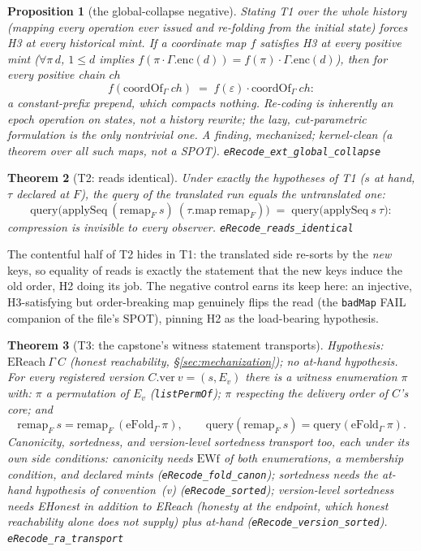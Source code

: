 \documentclass[11pt]{article}
\newtheorem{theorem}{Theorem}[section]
\newtheorem{proposition}[theorem]{Proposition}
\newcommand{\lean}[1]{\texttt{#1}}
\newcommand{\code}[1]{\texttt{#1}}
\begin{document}
\begin{proposition}[the global-collapse negative]
\label{prop:globalcollapse}
Stating T1 over the whole history (mapping every operation ever
issued and re-folding from the initial state) forces H3 at
every historical mint. If a coordinate map $f$ satisfies H3 at
\emph{every} positive mint ($\forall \pi\, d$, $1 \le d$ implies
$f(\pi \cdot \Gamma.\mathrm{enc}(d)) = f(\pi) \cdot
\Gamma.\mathrm{enc}(d)$), then for every positive chain $\mathit{ch}$
\[
  f(\mathrm{coordOf}_\Gamma\ \mathit{ch}) \;=\; f(\varepsilon) \cdot
  \mathrm{coordOf}_\Gamma\ \mathit{ch} :
\]
a constant-prefix prepend, which compacts \emph{nothing}. Re-coding is
inherently an epoch operation on states, not a history rewrite; the
lazy, cut-parametric formulation is the only nontrivial one. A
finding, mechanized; kernel-clean (a theorem over all such maps, not a
SPOT).
\hfill\lean{eRecode\_ext\_global\_collapse}
\end{proposition}

\begin{theorem}[T2: reads identical]
\label{thm:recode2}
Under exactly the hypotheses of T1 ($s$ at hand, $\tau$ declared at
$F$), the query of the translated run equals the untranslated one:
\[
  \mathrm{query}\bigl(\mathrm{applySeq}\ (\mathrm{remap}_F\ s)\
  (\tau.\mathrm{map}\ \mathrm{remap}_F)\bigr)
  \;=\; \mathrm{query}\bigl(\mathrm{applySeq}\ s\ \tau\bigr) :
\]
compression is invisible to every observer.
\hfill\lean{eRecode\_reads\_identical}
\end{theorem}

\noindent The contentful half of T2 hides in T1: the translated side
re-sorts by the \emph{new} keys, so equality of reads is exactly the
statement that the new keys induce the old order, H2 doing its job.
The negative control earns its keep here: an injective, H3-satisfying
but order-breaking map genuinely flips the read (the \code{badMap}
FAIL companion of the file's SPOT), pinning H2 as the load-bearing
hypothesis.

\begin{theorem}[T3: the capstone's witness statement transports]
\label{thm:recode3}
Hypothesis: $\mathrm{EReach}\ \Gamma\ C$ (honest reachability,
\S\ref{sec:mechanization}); no at-hand hypothesis. For every
registered version $C.\mathrm{ver}\ v = (s, E_v)$ there is a witness
enumeration $\pi$ with: $\pi$ a permutation of $E_v$
(\lean{listPermOf}); $\pi$ respecting the delivery order of $C$'s
core; and
\[
  \mathrm{remap}_F\ s = \mathrm{remap}_F\ (\mathrm{eFold}_\Gamma\
  \pi), \qquad
  \mathrm{query}(\mathrm{remap}_F\ s) =
  \mathrm{query}(\mathrm{eFold}_\Gamma\ \pi).
\]
Canonicity, sortedness, and version-level sortedness transport too,
each under its own side conditions: canonicity needs $\mathrm{EWf}$ of
both enumerations, a membership condition, and declared mints
(\lean{eRecode\_fold\_canon}); sortedness needs the at-hand hypothesis
of convention~(v) (\lean{eRecode\_sorted}); version-level sortedness
needs \emph{EHonest in addition to EReach} (honesty at the endpoint,
which honest reachability alone does not supply) plus at-hand
(\lean{eRecode\_version\_sorted}).
\hfill\lean{eRecode\_ra\_transport}
\end{theorem}
\end{document}
